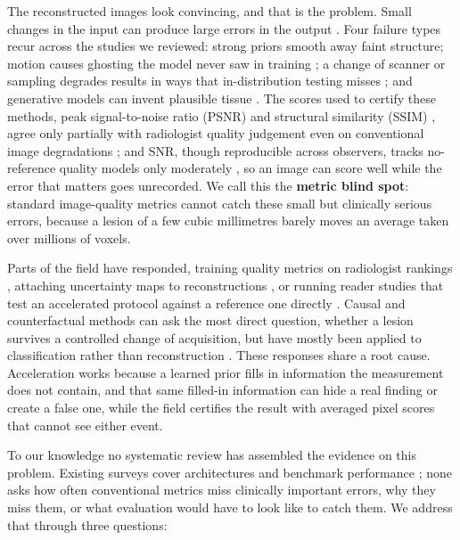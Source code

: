 \documentclass[review,authoryear]{elsarticle}
\begin{document}
The reconstructed images look convincing, and that is the problem. Small changes in the
input can produce large errors in the output
\citep{antun2020instabilities,gottschling2020troublesome}. Four failure types recur
across the studies we reviewed: strong priors smooth away faint structure; motion causes
ghosting the model never saw in training \citep{sommer2020correction}; a change of
scanner or sampling degrades results in ways that in-distribution testing misses
\citep{gngr2023adaptive}; and generative models can invent plausible tissue
\citep{zhou2024adversarial}. The scores used to certify these methods, peak
signal-to-noise ratio (PSNR) and structural similarity (SSIM) \citep{wang2004image},
agree only partially with radiologist quality judgement even on conventional image
degradations \citep{mason2020comparison}; and SNR, though reproducible across observers,
tracks no-reference quality models only moderately \citep{yu2018a}, so an
image can score well while the error that matters goes unrecorded. We call this the
\textbf{metric blind spot}: standard image-quality metrics cannot catch these small but
clinically serious errors, because a lesion of a few cubic millimetres barely moves an
average taken over millions of voxels.

Parts of the field have responded, training quality metrics on radiologist rankings
\citep{tang2025incorporating}, attaching uncertainty maps to reconstructions
\citep{khawaled2024npbrec}, or running reader studies that test an accelerated
protocol against a reference one directly
\citep{lang2024ultrafast,radmanesh2022exploring}. Causal and
counterfactual methods can ask the most direct question, whether a lesion survives a
controlled change of acquisition, but have mostly been applied to classification rather
than reconstruction \citep{pawlowski2020deep,castro2020causality}. These responses share
a root cause. Acceleration works because a learned prior fills in information the
measurement does not contain, and that same filled-in information can hide a real
finding or create a false one, while the field certifies the result with averaged pixel
scores that cannot see either event.

To our knowledge no systematic review has assembled the evidence on this problem.
Existing surveys cover architectures and benchmark performance
\citep{liang2020deep,montalt2021machine}; none asks how often conventional metrics miss
clinically important errors, why they miss them, or what evaluation would have to look
like to catch them. We address that through three questions:
\end{document}
